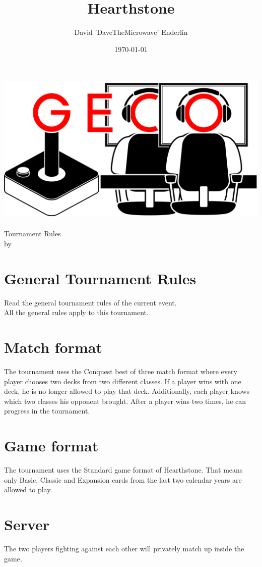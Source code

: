 \documentclass{article}
\title{Hearthstone}
\author{David 'DaveTheMicrowave' Enderlin}
\date{\today}
\begin{document}
\makeatletter
\begin{titlepage}
\centering
\includegraphics[scale=0.075]{GECo.png}\\
\LARGE \@title\\ Tournament Rules\\ \normalsize by \@author\\ \@date
\end{titlepage}
\makeatother


\clearpage

\tableofcontents
\clearpage

\section{General Tournament Rules}
Read the general tournament rules of the current event.\\
All the general rules apply to this tournament.

\section{Match format}
The tournament uses the Conquest best of three match format where every player chooses two decks from two different classes. If a player wins with one deck, he is no longer allowed to play that deck. Additionally, each player knows which two classes his opponent brought. After a player wins two times, he can progress in the tournament.

\section{Game format}
The tournament uses the Standard game format of Hearthstone. That means only Basic, Classic and Expansion cards from the last two calendar years are allowed to play.

\section{Server}
The two players fighting against each other will privately match up inside the game.
\end{document}
